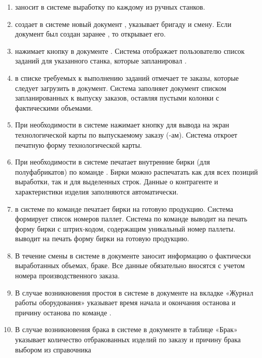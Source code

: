 \begin{enumerate}
\item	\operator заносит в системе \gofro выработку по каждому из ручных станков.
\item	\operator создает в системе \gofro новый документ , указывает  бригаду и смену. Если документ был создан заранее \planner, то открывает его.
\item	\operator нажимает кнопку  в документе . Система \gofro отображает пользователю список заданий для указанного станка, которые запланировал \planner. 
\item	\operator в списке требуемых к выполнению заданий отмечает те заказы, которые следует загрузить в документ. Система \gofro заполняет документ списком запланированных к выпуску заказов, оставляя пустыми колонки с фактическими объемами.
\item	При необходимости \operator в системе \gofro  нажимает кнопку  для вывода на экран технологической карты по выпускаемому заказу (-ам). Система \gofro откроет печатную форму технологической карты.
\item При необходимости \operator в системе \gofro печатает внутренние бирки (для полуфабрикатов) по команде . Бирки можно распечатать как для всех позиций выработки, так и для выделенных строк. Данные о контрагенте и характеристики изделия заполняются автоматически.
\item	\operator в системе \gofro по команде  печатает бирки на готовую продукцию. Система \gofro формирует список номеров паллет. Система \gofro по команде  
\ifnum{}
   выводит на печать форму бирки с штрих-кодом, 
   содержащим уникальный номер паллеты.
\else
   выводит на печать форму бирки на готовую продукцию. 
\fi
\item	В течение смены \operator в системе \gofro в документе   заносит информацию о фактически выработанных объемах, браке. Все данные обязательно вносятся с учетом номера производственного заказа.
\item	В случае возникновения простоя \operator  в системе \gofro в документе  на вкладке «Журнал работы оборудования» указывает время начала и окончания останова и причину останова по команде .
\item	В случае возникновения брака \operator  в системе \gofro в документе   в таблице «Брак» указывает количество отбракованных изделий по заказу и причину брака выбором из справочника

\end{enumerate}
